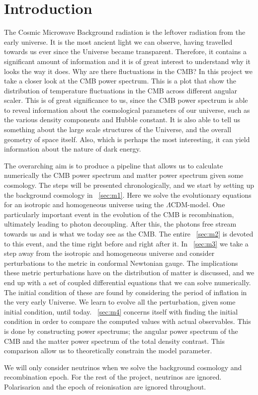 \section{Introduction}\label{sec:introduction}

The Cosmic Microwave Background radiation is the leftover radiation from the early universe. It is the most ancient light we can observe, having travelled towards us ever since the Universe became transparent. Therefore, it contains a significant amount of information and it is of great interest to understand why it looks the way it does. Why are there fluctuations in the CMB? In this project we take a closer look at the CMB power spectrum. This is a plot that show the distribution of temperature fluctuations in the CMB across different angular scaler. This is of great significance to us, since the CMB power spectrum is able to reveal information about the cosmological parameters of our universe, such as the various density components and Hubble constant. It is also able to tell us something about the large scale structures of the Universe, and the overall geometry of space itself. Also, which is perhaps the most interesting, it can yield information about the nature of dark energy. 

The overarching aim is to produce a pipeline that allows us to calculate numerically the CMB power spectrum and matter power spectrum given some cosmology. The steps will be presented chronologically, and we start by setting up the background cosmology in ~\cref{sec:m1}. Here we solve the evolutionary equations for an isotropic and homogeneous universe using the $\Lambda$CDM-model. One particularly important event in the evolution of the CMB is recombination, ultimately leading to photon decoupling. After this, the photons free stream towards us and is what we today see as the CMB. The entire ~\cref{sec:m2} is devoted to this event, and the time right before and right after it. In ~\cref{sec:m3} we take a step away from the isotropic and homogeneous universe and consider perturbations to the metric in conformal Newtonian gauge. The implications these metric perturbations have on the distribution of matter is discussed, and we end up with a set of coupled differential equations that we can solve numerically. The initial condition of these are found by considering the period of inflation in the very early Universe. We learn to evolve all the perturbation, given some initial condition, until today. ~\cref{sec:m4} concerns itself with finding the initial condition in order to compare the computed values with actual observables. This is done by constructing power spectrums; the angular power spectrum of the CMB and the matter power spectrum of the total density contrast. This comparison allow us to theoretically constrain the model parameter.  

We will only consider neutrinos when we solve the background cosmology and recombination epoch. For the rest of the project, neutrinos are ignored. Polarisarion and the epoch of reionisation are ignored throughout. 